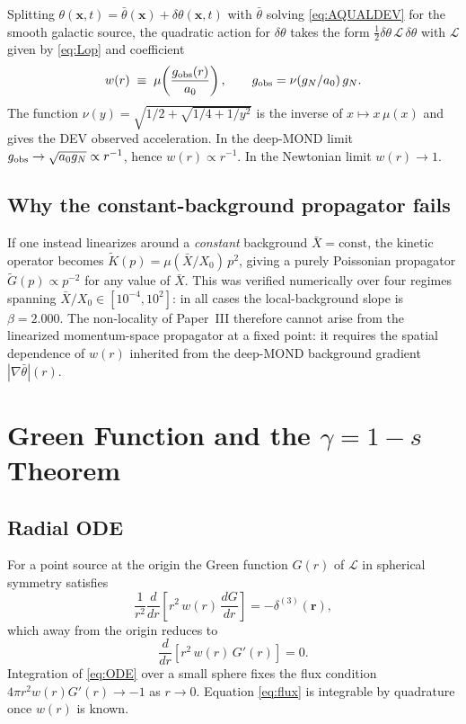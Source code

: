 \documentclass[aps,prd,twocolumn,superscriptaddress,nofootinbib]{revtex4-2}
\begin{document}
Splitting $\theta(\mathbf{x},t) = \bar\theta(\mathbf{x}) +
\delta\theta(\mathbf{x},t)$ with $\bar\theta$ solving
\eqref{eq:AQUALDEV} for the smooth galactic source, the quadratic
action for $\delta\theta$ takes the form $\tfrac{1}{2}\delta\theta\,
\mathcal{L}\,\delta\theta$ with $\mathcal{L}$ given by
\eqref{eq:Lop} and coefficient
\begin{equation}
w(r) \;\equiv\; \mu\!\left(\frac{g_{\rm obs}(r)}{a_0}\right),
\qquad g_{\rm obs} = \nu(g_N/a_0)\,g_N.
\label{eq:wofr}
\end{equation}
The function $\nu(y) = \sqrt{1/2 + \sqrt{1/4 + 1/y^2}}$ is the
inverse of $x\mapsto x\,\mu(x)$ and gives the DEV observed
acceleration. In the deep-MOND limit $g_{\rm obs}\to
\sqrt{a_0 g_N}\propto r^{-1}$, hence $w(r)\propto r^{-1}$. In the
Newtonian limit $w(r)\to 1$.

\subsection{Why the constant-background propagator fails}

If one instead linearizes around a \emph{constant} background
$\bar X = \mathrm{const}$, the kinetic operator becomes
$\widetilde K(p) = \mu(\bar X / X_0)\,p^2$, giving a purely
Poissonian propagator $\widetilde G(p)\propto p^{-2}$ for any
value of $\bar X$. This was verified numerically over four regimes
spanning $\bar X/X_0 \in [10^{-4}, 10^2]$: in all cases the
local-background slope is $\beta = 2.000$. The non-locality of
Paper~III therefore cannot arise from the linearized momentum-space
propagator at a fixed point: it requires the spatial dependence of
$w(r)$ inherited from the deep-MOND background gradient
$|\nabla\bar\theta|(r)$.

\section{Green Function and the $\gamma = 1-s$ Theorem}\label{sec:green}

\subsection{Radial ODE}

For a point source at the origin the Green function $G(r)$ of
$\mathcal{L}$ in spherical symmetry satisfies
\begin{equation}
\frac{1}{r^2}\frac{d}{dr}\!\left[r^2\,w(r)\,\frac{dG}{dr}\right] =
-\delta^{(3)}(\mathbf{r}),
\label{eq:ODE}
\end{equation}
which away from the origin reduces to
\begin{equation}
\frac{d}{dr}\!\left[r^2\,w(r)\,G'(r)\right] = 0.
\label{eq:flux}
\end{equation}
Integration of \eqref{eq:ODE} over a small sphere fixes the flux
condition $4\pi r^2 w(r) G'(r)\to -1$ as $r\to 0$. Equation
\eqref{eq:flux} is integrable by quadrature once $w(r)$ is known.
\end{document}

